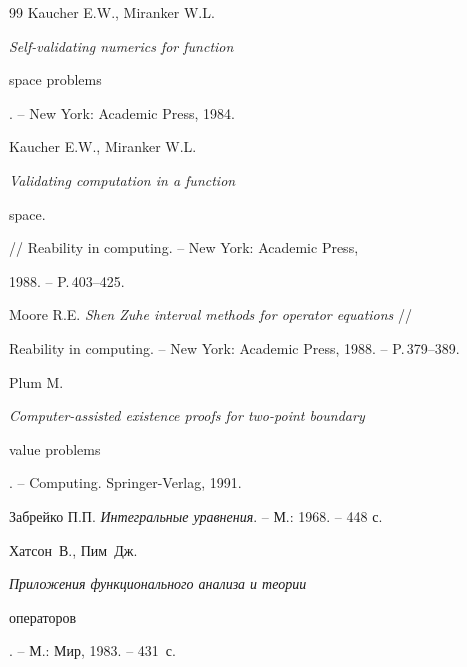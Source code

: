 \begin{thebibliography}{99}
Kaucher E.W., Miranker W.L. {\em Self-validating numerics for function


space problems}. -- New York: Academic Press, 1984.







Kaucher E.W., Miranker W.L. {\em Validating computation in a function


space.} // Reability in computing. -- New York: Academic Press, 


1988. -- P.\,403--425.







Moore R.E. {\em Shen Zuhe interval methods for operator equations} //


Reability in computing. -- New York: Academic Press, 1988. -- P.\,379--389.







Plum M. {\em Computer-assisted existence proofs for two-point boundary


value problems}. -- Computing. Springer-Verlag, 1991.







Забрейко П.П. {\em Интегральные уравнения}. -- М.: 1968. -- 448 с.







Хатсон~В., Пим~Дж. {\em Приложения функционального анализа и теории


операторов}. -- М.: Мир, 1983. -- 431~с.





\end{thebibliography} 


 


\vskip 2cm 


 






 




 


